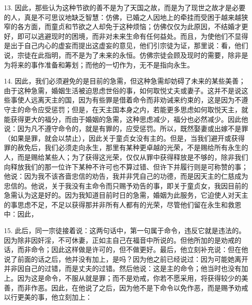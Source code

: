 13. 因此，那些认为这种节欲的善不是为了天国之故，而是为了现世之故才是必要的人，真是不可思议地缺乏智慧：仿佛，已婚之人因地上的牵挂而受困于越来越狭窄的各方面，而童贞和节欲之人却免于这种烦恼；仿佛仅仅为此原因，不结婚才更好，即可以逃避现时的困境，而非对未来生命有任何益处。而且，为使他们不显得是出于自己内心的虚妄而提出这虚妄的意见，他们引宗徒为证，那里说：看，他们说，宗徒在此指明，而不是为了未来的永恒。仿佛宗徒会顾及现时的需要，除非是为将来的事作准备和筹划；而他的一切作为，无不是指向永生。\par

14. 因此，我们必须避免的是目前的急需，但这种急需却妨碍了未来的某些美善；由于这种急需，婚姻生活被迫思虑世俗的事，如何取悦丈夫或妻子。这并不是说这些事使人远离天主的国，因为有些罪是借着命令而非劝诫来约束的，这是因为不遵守主的命令应受惩罚；但是，在天主国本身之内，若能更多思虑如何取悦天主，就能获得更大的福分，而由于婚姻的急需，这种思虑减少，福分也必然减少。因此他说：因为凡不遵守命令的，就是有罪的，应受惩罚。所以，既然娶妻或出嫁不是罪（如果是罪，就会以禁止），因此关于童贞女没有主的。但是，当我们避开或获得罪的赦免后，我们必须走向永生，那里有某种更卓越的光荣，不是赐给所有永生的人，而是赐给某些人；为了获得这光荣，仅仅从罪中获得释放是不够的，除非我们向释放我们的那一位许下某种不许可也不算过错、但许下并履行则是可称赞的事；他说：因为我不该吝啬忠信的劝告，我并非凭自己的功德，而是因天主的仁慈成为忠信的。他说，关于我没有主命令而只赐予劝告的事，即关于童贞女，我因目前的急需认为这是好的。因为我知道目前时日的急需，婚姻为此服务，它迫使人对天主的事思虑不足，不足以获得那并非所有人都有的光荣，尽管他们留在永生和救恩中：因此，\par

15. 此后，同一宗徒接着说：这两句话中，第一句属于命令，违反它就是违法的。因为除非因奸淫，不可休妻，正如主自己在福音中所说的。但他所加的是劝戒的话，而非命令；因此这样做是许可的，但不做更好。最后，他立刻补充说：但在他说了前面的话之后，他并没有加上，是吗？因为他之前已经说过：因为可能她离开并非因自己的过错，而是丈夫的过错。然后他说：这是主的命令；他当时也没有加上。因为这是命令，不服从就是罪；而不是劝戒，你若不愿采用，将获得较少的美善，而非作恶。因此，在他说了之后，因为他不是下命令以免作恶，而是赐予劝戒以行更美的事，他立刻加上：\par

